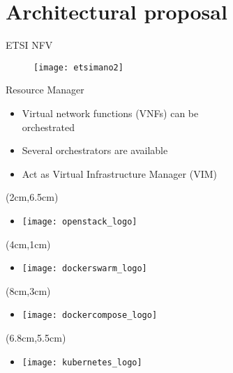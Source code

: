 \section{Architectural proposal}
\begin{frame}{ETSI NFV}
  \begin{figure}
    \centering
    \texttt{[image: etsimano2]}
  \end{figure}
\end{frame}

\begin{frame}{Resource Manager}
  \begin{itemize}
  \item<1-> Virtual network functions (VNFs) can be\\ orchestrated
  \item<2-> Several orchestrators are available
  \item<7-> Act as Virtual Infrastructure Manager (VIM)
  \end{itemize}

  \begin{textblock*}{5cm}(2cm,6.5cm)
    \begin{itemize}
    \item[]<3-> \texttt{[image: openstack\_logo]}
    \end{itemize}
  \end{textblock*}

  \begin{textblock*}{5cm}(4cm,1cm)
    \begin{itemize}
    \item[]<4-> \texttt{[image: dockerswarm\_logo]}
    \end{itemize}
  \end{textblock*}

  \begin{textblock*}{5cm}(8cm,3cm)
    \begin{itemize}
    \item[]<5-> \texttt{[image: dockercompose\_logo]}
    \end{itemize}
  \end{textblock*}

  \begin{textblock*}{5cm}(6.8cm,5.5cm)
    \begin{itemize}
    \item[]<6-> \texttt{[image: kubernetes\_logo]}
    \end{itemize}
  \end{textblock*}
\end{frame}


